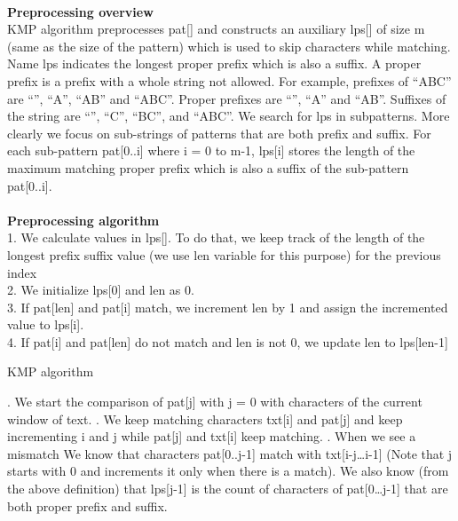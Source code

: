 \documentclass[11pt,a4paper]{article}
\begin{document}
\\
\textbf{Preprocessing overview}
\\
KMP algorithm preprocesses pat[] and constructs an auxiliary lps[] of size m (same as the size of the pattern) which is used to skip characters while matching.
Name lps indicates the longest proper prefix which is also a suffix. A proper prefix is a prefix with a whole string not allowed. For example, prefixes of “ABC” are “”, “A”, “AB” and “ABC”. Proper prefixes are “”, “A” and “AB”. Suffixes of the string are “”, “C”, “BC”, and “ABC”.
We search for lps in subpatterns. More clearly we focus on sub-strings of patterns that are both prefix and suffix.
For each sub-pattern pat[0..i] where i = 0 to m-1, lps[i] stores the length of the maximum matching proper prefix which is also a suffix of the sub-pattern pat[0..i].
\\
\\
\textbf{Preprocessing algorithm}
\\
1. We calculate values in lps[]. To do that, we keep track of the length of the longest prefix suffix value (we use len variable for this purpose) for the previous index
\\
2. We initialize lps[0] and len as 0.
\\
3. If pat[len] and pat[i] match, we increment len by 1 and assign the incremented value to lps[i].
\\
4. If pat[i] and pat[len] do not match and len is not 0, we update len to lps[len-1]

\begin{algorithm}[H]
\caption*{KMP algorithm}
\label{spapsuedocode}
\begin{algorithmic}
. We start the comparison of pat[j] with j = 0 with characters of the current window of text.
. We keep matching characters txt[i] and pat[j] and keep incrementing i and j while pat[j] and txt[i] keep matching.
. When we see a mismatch
\STATE \hspace{1cm}  We know that characters pat[0..j-1] match with txt[i-j…i-1] (Note that j starts with 0 and increments it only when there is a match).
\STATE \hspace{1cm} We also know (from the above definition) that lps[j-1] is the count of characters of pat[0…j-1] that are both proper prefix and suffix.
\end{algorithmic}
\end{algorithm}
\end{document}
